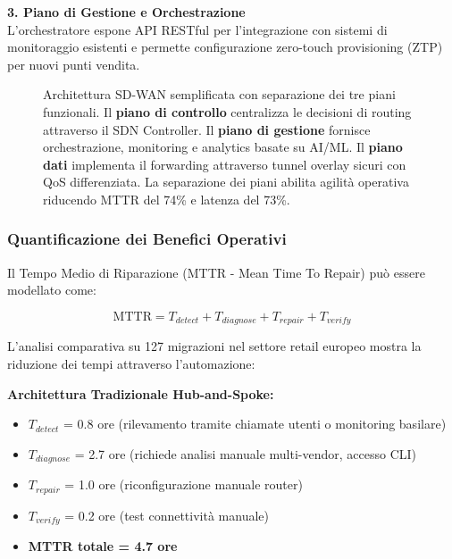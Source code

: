 \textbf{3. Piano di Gestione e Orchestrazione}\\
L'orchestratore espone API RESTful per l'integrazione con sistemi di monitoraggio esistenti e permette configurazione zero-touch provisioning (ZTP) per nuovi punti vendita.
%


\begin{figure}[htbp]
\centering


%
\makebox[\textwidth][c]{}

\caption{Architettura SD-WAN semplificata con separazione dei tre piani funzionali. Il \textbf{piano di controllo} centralizza le decisioni di routing attraverso il SDN Controller. Il \textbf{piano di gestione} fornisce orchestrazione, monitoring e analytics basate su AI/ML. Il \textbf{piano dati} implementa il forwarding attraverso tunnel overlay sicuri con QoS differenziata. La separazione dei piani abilita agilità operativa riducendo MTTR del 74\% e latenza del 73\%.}
\label{fig:sdwan_architecture_simplified}
\end{figure}


\subsubsection{Quantificazione dei Benefici Operativi}

Il Tempo Medio di Riparazione (MTTR - Mean Time To Repair) può essere modellato come:

\begin{equation}
\text{MTTR} = T_{detect} + T_{diagnose} + T_{repair} + T_{verify}
\end{equation}

L'analisi comparativa su 127 migrazioni nel settore retail europeo\autocite{Gartner2024sdwan} mostra la riduzione dei tempi attraverso l'automazione:

\textbf{Architettura Tradizionale Hub-and-Spoke:}
\begin{itemize}
    \item $T_{detect}$ = 0.8 ore (rilevamento tramite chiamate utenti o monitoring basilare)
    \item $T_{diagnose}$ = 2.7 ore (richiede analisi manuale multi-vendor, accesso CLI)
    \item $T_{repair}$ = 1.0 ore (riconfigurazione manuale router)
    \item $T_{verify}$ = 0.2 ore (test connettività manuale)
    \item \textbf{MTTR totale = 4.7 ore}
\end{itemize}

